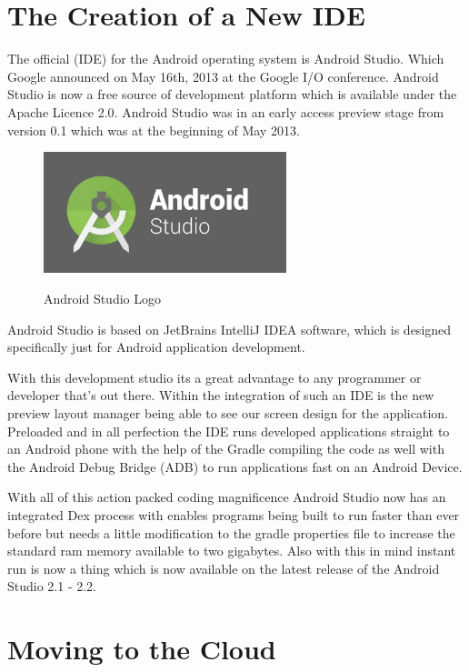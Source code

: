 \section{The Creation of a New IDE}
The official (IDE) for the Android operating system is Android Studio. Which Google announced on May 16th, 2013 at the Google I/O conference. Android Studio is now a free source of development platform which is available under the Apache Licence 2.0. Android Studio was in an early access preview stage from version 0.1 which was at the beginning of May 2013. \cite{developers2015android} \par

\begin{figure}[htbp]
    \center \includegraphics[width=200pt]{androidstudiologo}\\
    \caption{Android Studio Logo \citep{studio6official}} \label{Figure: Android Studio Logo 
        Area}
\end{figure}

Android Studio is based on JetBrains IntelliJ IDEA software, which is designed specifically just for Android application development.\cite{studio6official}
 \par 
With this development studio its a great advantage to any programmer or developer that's out there. Within the integration of such an IDE is the new preview layout manager being able to see our screen design for the application. Preloaded and in all perfection the IDE runs developed applications straight to an Android phone with the help of the Gradle compiling the code as well with the Android Debug Bridge (ADB) to run applications fast on an Android Device.
\par
With all of this action packed coding magnificence Android Studio now has an integrated Dex process with enables programs being built to run faster than ever before but needs a little modification to the gradle properties file to increase the standard ram memory available to two gigabytes. Also with this in mind instant run is now a thing which is now available on the latest release of the Android Studio 2.1 - 2.2.
 
\section{Moving to the Cloud}

